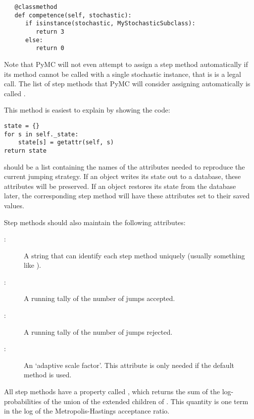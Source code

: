 \begin{description}
\begin{verbatim}
   @classmethod
   def competence(self, stochastic):
      if isinstance(stochastic, MyStochasticSubclass):
         return 3
      else:
         return 0
\end{verbatim}
   Note that PyMC will not even attempt to assign a step method automatically if its  method cannot be called with a single stochastic instance, that is  is a legal call. The list of step methods that PyMC will consider assigning automatically is called .
   \item[\code{current_state()}:] This method is easiest to explain by showing the code:
   \begin{verbatim}
state = {}
for s in self._state:
    state[s] = getattr(self, s)
return state      
   \end{verbatim}
    should be a list containing the names of the attributes needed to reproduce the current jumping strategy. If an  object writes its state out to a database, these attributes will be preserved. If an  object restores its state from the database later, the corresponding step method will have these attributes set to their saved values.
\end{description}

Step methods should also maintain the following attributes:
\begin{description}
   \item[:] A string that can identify each step method uniquely (usually something like ).
   \item[:] A running tally of the number of jumps accepted.
   \item[:] A running tally of the number of jumps rejected.   
   \item[:] An `adaptive scale factor'. This attribute is only needed if the default  method is used.
\end{description}

All step methods have a property called , which returns the sum of the log-probabilities of the union of the extended children of . This quantity is one term in the log of the Metropolis-Hastings acceptance ratio.


\hypertarget{user-metro}{}

